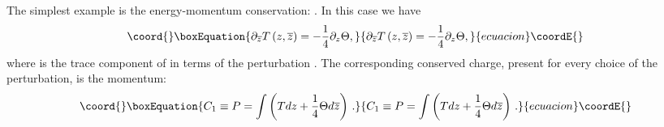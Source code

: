 \documentclass[a4paper,12pt]{report}
\begin{document}
\vspace{0.5cm}

The simplest example is the energy-momentum conservation: \coordHE{}. In this case we have
\begin{equation}\coord{}\boxEquation{
\partial _{\overline{z}}T\left(z,\overline{z} \right)=-\frac{1}{4}\partial _{z}\Theta ,
}{
\partial _{\overline{z}}T\left(z,\overline{z} \right)=-\frac{1}{4}\partial _{z}\Theta ,
}{ecuacion}\coordE{}\end{equation}
where \coordHE{} is the trace
component of \coordHE{} in terms of the perturbation \coordHE{}. The corresponding conserved charge, present
for every choice of the perturbation, is the momentum:
\begin{equation}\coord{}\boxEquation{
C_{1}\equiv P=\int\left(T dz+\frac{1}{4}\Theta d \overline{z}\right)\,.
}{
C_{1}\equiv P=\int\left(T dz+\frac{1}{4}\Theta d \overline{z}\right)\,.
}{ecuacion}\coordE{}\end{equation}


\vspace{0.5cm}
\end{document}
